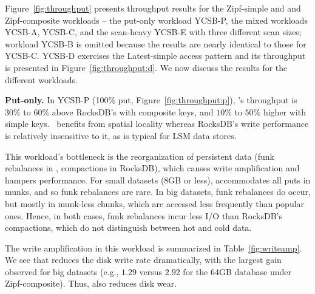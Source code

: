 Figure~\ref{fig:throughput} presents throughput results for the Zipf-simple and 
and Zipf-composite workloads -- the put-only workload YCSB-P, the mixed
workloads YCSB-A, YCSB-C, and the scan-heavy YCSB-E with three different scan sizes; 
workload YCSB-B is omitted because the results are nearly identical to those 
for YCSB-C. YCSB-D exercises the Latest-simple  access pattern and 
its throughput is presented in Figure~\ref{fig:throughput:d}. 
%
We now discuss the results for the different workloads.  

{\bf Put-only.} 
In
{YCSB-P} (100\% put, Figure~\ref{fig:throughput:p}), 
\sys's throughput is $30\%$ to $60\%$ above RocksDB's with composite keys, 
and $10\%$ to $50\%$ higher with simple keys. 
\sys\ benefits from spatial locality whereas RocksDB's write performance 
is relatively insensitive to it, as is typical for LSM data stores.

This workload's bottleneck is the reorganization of persistent data  
(funk rebalances in \sys, compactions in RocksDB), which causes 
write amplification and hampers performance. 
For small datasets (8GB or less), \sys\/ accommodates all puts in munks, and so
funk rebalances are rare. In big datasets, funk rebalances do occur, but mostly in munk-less 
chunks, which are accessed less frequently than popular ones. 
Hence, in both cases, funk rebalances incur less I/O than RocksDB's compactions, which do not 
distinguish between hot and cold data. 

The write amplification in this workload is summarized in 
Table~\ref{fig:writeamp}. We see that \sys\/ reduces the disk write rate dramatically, 
with the largest gain observed for big datasets (e.g., $1.29$ versus $2.92$ for the 64GB 
database under Zipf-composite). Thus, \sys\/ also reduces disk wear.  


